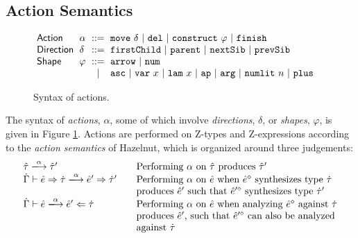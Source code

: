 \documentclass{llncs}
\begin{document}
\vspace{-8px}
\subsection{Action Semantics}\label{sec:actions}
\begin{figure}[t]
\hspace{-3px}$\arraycolsep=3pt\begin{array}{llcllll}
\mathsf{Action} & \alpha & ::= &
  \aMove{\delta} ~\vert~
  \aDel ~\vert~
  \aConstruct{\varphi} ~\vert~
  \aFinish\\
\mathsf{Direction} & \delta & ::= &
  \dChild ~\vert~
  \dParent ~\vert~
  \dNext ~\vert~
  \dPrev\\
\mathsf{Shape} & \varphi & ::= &
  \farr ~\vert~
  \fnum \\
& & \vert &
  \fasc ~\vert~
  \fvar{x} ~\vert~
  \flam{x} ~\vert~
  \fap ~\vert~
  \farg ~\vert~
  \fnumlit{n} ~\vert~
  \fplus
\end{array}$
\caption{Syntax of actions.}
\label{fig:action-syntax}
\vspace{-8px}
\end{figure}

The syntax of \emph{actions}, $\alpha$, some of which involve \emph{directions}, $\delta$, or \emph{shapes}, $\varphi$, is given in Figure \ref{fig:action-syntax}. Actions are performed on Z-types and Z-expressions according to the \emph{action semantics} of Hazelnut, which is organized around three judgements:
\[\arraycolsep=10pt\begin{array}{ll}
\performTyp{\ztau}{\alpha}{\ztau'} & \text{Performing $\alpha$ on $\ztau$ produces $\ztau'$}\\
\performSyn{\hGamma}{\zexp}{\htau}{\alpha}{\zexp'}{\htau'} & \text{Performing $\alpha$ on $\zexp$ when $\removeSel{\zexp}$ synthesizes type $\htau$}\\
& \text{produces $\zexp'$ such that $\removeSel{\zexp'}$ synthesizes type $\htau'$}\\
\performAna{\hGamma}{\zexp}{\htau}{\alpha}{\zexp'} & \text{Performing $\alpha$ on $\zexp$ when analyzing $\removeSel{\zexp}$ against $\htau$}\\
& \text{produces $\zexp'$, such that $\removeSel{\zexp'}$ can also be analyzed}\\
& \text{against $\htau$}
\end{array}\]
\end{document}
